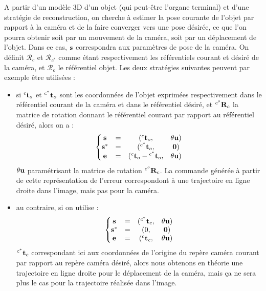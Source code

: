 A partir d'un mod\`ele 3D d'un objet (qui peut-\^etre l'organe terminal) et 
d'une strat\'egie de reconstruction, on cherche \`a estimer la pose courante de 
l'objet par rapport \`a la cam\'era et de la faire converger vers une pose 
d\'esir\'ee, ce que l'on pourra obtenir soit par un mouvement de la cam\'era, 
soit par un d\'eplacement de l'objet. Dans ce cas, ${\bf s}$ correspondra aux 
param\`etres de pose de la cam\'era. On d\'efinit $\mathcal R_c$ et $\mathcal 
R_{c^*}$ comme \'etant respectivement les r\'ef\'erentiels courant et d\'esir\'e 
de la cam\'era, et $\mathcal R_o$ le r\'ef\'erentiel objet. Les 
deux strat\'egies suivantes peuvent par exemple \^etre utilis\'ees 
\cite{samson1991} :
\begin{itemize}
 \item si ${}^c{\bf t}_o$ et ${}^{c^*}{\bf t}_o$ sont les coordonn\'ees de 
l'objet exprim\'ees respectivement dans le r\'ef\'erentiel courant de la 
cam\'era et dans le r\'ef\'erentiel d\'esir\'e, et ${}^{c^o}{\bf R}_c$ la 
matrice de rotation donnant le r\'ef\'erentiel courant par rapport au 
r\'ef\'erentiel d\'esir\'e, alors on a :
 \begin{equation}
 \left \lbrace
 \begin{matrix}
  {\bf s} &=& ({}^c{\bf t}_o,& \theta {\bf u}) \\
  {\bf s}^* &=& ({}^{c^*}{\bf t}_o,& {\bf 0}) \\
  {\bf e} &=& ({}^c{\bf t}_o - {}^{c^*}{\bf t}_o,& \theta {\bf u})
 \end{matrix}
  \right .
\label{chap01:eq11}
\end{equation}
$\theta {\bf u}$ param\'etrisant la matrice de rotation ${}^{c^o}{\bf R}_c$. La 
commande g\'en\'er\'ee \`a partir de cette repr\'esentation de 
l'erreur correspondont \`a une trajectoire en ligne droite dans l'image, mais 
pas pour la cam\'era.
\item au contraire, si on utilise :
\begin{equation}
 \left \lbrace
 \begin{matrix}
  {\bf s} &=& ({}^{c^*}{\bf t}_c,& \theta {\bf u}) \\
  {\bf s}^* &=& (0,& {\bf 0}) \\
  {\bf e} &=& ({}^c{\bf t}_c,& \theta {\bf u})
 \end{matrix}
  \right .
\label{chap01:eq12}
\end{equation}
${}^{c^*}{\bf t}_c$ correspondant ici aux coordonn\'ees de l'origine du 
rep\`ere cam\'era courant par rapport au rep\`ere cam\'era d\'esir\'e, alors 
nous obtenons en th\'eorie une trajectoire en ligne droite pour le d\'eplacement 
de la cam\'era, mais ça ne sera plus le cas pour la trajectoire r\'ealis\'ee 
dans l'image.
\end{itemize}

